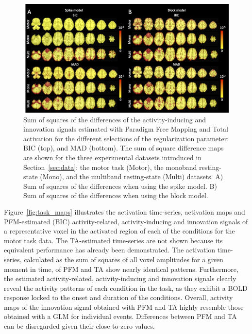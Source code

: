 \begin{figure}[H]
    \begin{center}
        \includegraphics[width=\textwidth]{figures/comp_figure.png}
    \end{center}
    \caption{Sum of squares of the differences of the activity-inducing and innovation signals estimated with Paradigm Free Mapping and Total activation for the different selections of the regularization parameter: BIC (top), and MAD (bottom). The sum of square difference maps are shown for the three experimental datasets introduced in Section~\ref{sec:data}: the motor task (Motor), the monoband resting-state (Mono), and the multiband resting-state (Multi) datasets. A) Sum of squares of the differences when using the spike model. B) Sum of squares of the differences when using the block model.}
\label{fig:rss}
\end{figure}

Figure~\ref{fig:task_maps} illustrates the activation time-series, activation maps and PFM-estimated (BIC) activity-related, activity-inducing and innovation signals of a representative voxel in the activated region of each of the conditions for the motor task data. The TA-estimated time-series are not shown because its equivalent performance has already been demonstrated. The activation time-series, calculated as the sum of squares of all voxel amplitudes for a given moment in time, of PFM and TA show nearly identical patterns. Furthermore, the estimated activity-related, activity-inducing and innovation signals clearly reveal the activity patterns of each condition in the task, as they exhibit a BOLD response locked to the onset and duration of the conditions. Overall, activity maps of the innovation signal obtained with PFM and TA highly resemble those obtained with a GLM for individual events. Differences between PFM and TA can be disregarded given their close-to-zero values.

